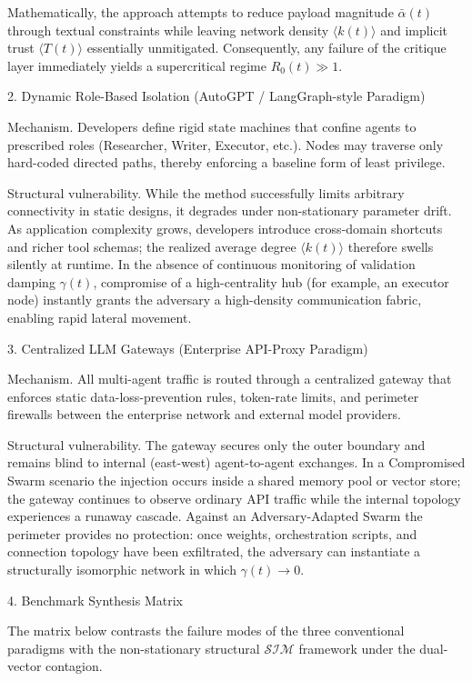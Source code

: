 Mathematically, the approach attempts to reduce payload magnitude \(\bar{\alpha}(t)\) through textual constraints while leaving network density \(\langle k(t)\rangle\) and implicit trust \(\langle T(t)\rangle\) essentially unmitigated. Consequently, any failure of the critique layer immediately yields a supercritical regime \(R_0(t)\gg 1\).

2. Dynamic Role-Based Isolation (AutoGPT / LangGraph-style Paradigm)

Mechanism.  
Developers define rigid state machines that confine agents to prescribed roles (Researcher, Writer, Executor, etc.). Nodes may traverse only hard-coded directed paths, thereby enforcing a baseline form of least privilege.

Structural vulnerability.  
While the method successfully limits arbitrary connectivity in static designs, it degrades under non-stationary parameter drift. As application complexity grows, developers introduce cross-domain shortcuts and richer tool schemas; the realized average degree \(\langle k(t)\rangle\) therefore swells silently at runtime. In the absence of continuous monitoring of validation damping \(\gamma(t)\), compromise of a high-centrality hub (for example, an executor node) instantly grants the adversary a high-density communication fabric, enabling rapid lateral movement.

3. Centralized LLM Gateways (Enterprise API-Proxy Paradigm)

Mechanism.  
All multi-agent traffic is routed through a centralized gateway that enforces static data-loss-prevention rules, token-rate limits, and perimeter firewalls between the enterprise network and external model providers.

Structural vulnerability.  
The gateway secures only the outer boundary and remains blind to internal (east-west) agent-to-agent exchanges. In a Compromised Swarm scenario the injection occurs inside a shared memory pool or vector store; the gateway continues to observe ordinary API traffic while the internal topology experiences a runaway cascade. Against an Adversary-Adapted Swarm the perimeter provides no protection: once weights, orchestration scripts, and connection topology have been exfiltrated, the adversary can instantiate a structurally isomorphic network in which \(\gamma(t)\to 0\).

4. Benchmark Synthesis Matrix

The matrix below contrasts the failure modes of the three conventional paradigms with the non-stationary structural \(\mathcal{S}\mathcal{I}\mathcal{M}\) framework under the dual-vector contagion.

